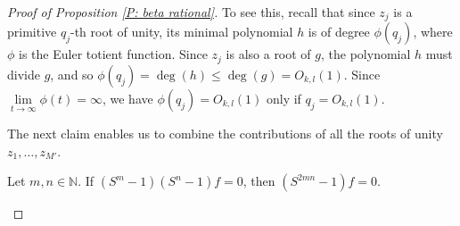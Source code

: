 \documentclass[10pt,a4paper]{amsart}
\begin{document}
\begin{proof}[Proof of Proposition \ref{P: beta rational}]
 To see this, recall that since  $z_j$ is a primitive $q_j$-th root of unity, its minimal polynomial $h$ is of degree $\phi(q_{j})$, where $\phi$ is the Euler totient function. Since $z_{j}$ is also a root of $g$, the polynomial $h$ must divide $g$, and so $\phi(q_{j})=\deg(h)\leq \deg(g)=O_{k,l}(1)$. Since $\lim\limits_{t\to\infty}\phi(t)=\infty$, we have $\phi(q_{j})=O_{k,l}(1)$ only if $q_{j}=O_{k,l}(1)$.
 
 

 

The next claim enables us to combine the contributions of all the roots of unity $z_1, \ldots, z_{M'}$.

\begin{claim}\label{Claim 4}
Let $m,n\in\mathbb{N}$. If $(S^{m}-1)(S^{n}-1)f=0$, then $(S^{2mn}-1)f=0$.    
\end{claim}


\end{proof}
\end{document}
